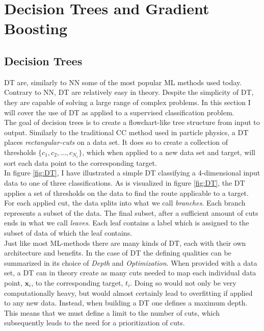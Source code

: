 \section{Decision Trees and Gradient Boosting}
\subsection{Decision Trees}
\acf{DT} are, similarly to \ac{NN} some of the most popular \ac{ML} methods used today.
Contrary to \ac{NN}, \ac{DT} are relatively easy in theory. Despite the simplicity of \ac{DT}, 
they are capable of solving a large range of complex problems. In this section I will cover the use 
of \ac{DT} as applied to a supervised classification problem.
\\
The goal of decision trees is to create a flowchart-like tree structure from input to output. 
Similarly to the traditional \ac{CC} method used in particle physics, a \ac{DT} 
places \emph{rectangular-cuts} on a data set. It does so to create a collection of thresholds 
$\{c_1, c_2,...,c_{N_c}\}$, which when applied to a new data set and target, 
will sort each data point to the corresponding target. 
\\
In figure \ref{fig:DT}, I have illustrated a simple \ac{DT} classifying a 4-dimensional 
input data to one of three classifications. As is visualized in figure \ref{fig:DT}, the \ac{DT} 
applies a set of thresholds on the data to find the route applicable to a target. For each applied 
cut, the data splits into what we call \emph{branches}. Each branch represents a subset of the data.
The final subset, after a sufficient amount of cuts ends in what we call \emph{leaves}. Each leaf contains
a label which is assigned to the subset of data of which the leaf contains.
\\  
Just like most \ac{ML}-methods there are many kinds of \ac{DT}, each with their own 
architecture and benefits. In the case of \ac{DT} the defining qualities can be summarized in
its choice of \emph{Depth} and \emph{Optimization}. When provided with a data set,
a \ac{DT} can in theory create as many cuts needed to map each individual data point, $\textbf{x}_i$, to the 
corresponding target, $t_i$. Doing so would not only be very computationally heavy, but would almost 
certainly lead to overfitting if applied to any new data. Instead, when building a \ac{DT} one defines 
a maximum depth. This means that we must define a limit to the number of cuts, which 
subsequently leads to the need for a prioritization of cuts. 
\\
